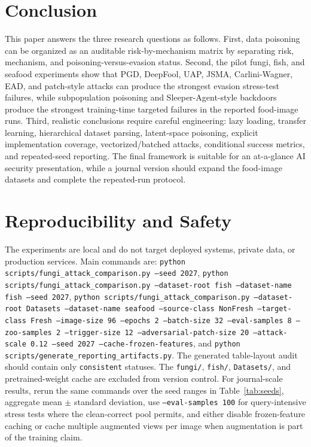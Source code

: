 ﻿\documentclass[6p,10pt,times]{ieeeaccess}
\begin{document}
\section{Conclusion}

This paper answers the three research questions as follows. First, data poisoning can be organized as an auditable risk-by-mechanism matrix by separating risk, mechanism, and poisoning-versus-evasion status. Second, the pilot fungi, fish, and seafood experiments show that PGD, DeepFool, UAP, JSMA, Carlini-Wagner, EAD, and patch-style attacks can produce the strongest evasion stress-test failures, while subpopulation poisoning and Sleeper-Agent-style backdoors produce the strongest training-time targeted failures in the reported food-image runs. Third, realistic conclusions require careful engineering: lazy loading, transfer learning, hierarchical dataset parsing, latent-space poisoning, explicit implementation coverage, vectorized/batched attacks, conditional success metrics, and repeated-seed reporting. The final framework is suitable for an at-a-glance AI security presentation, while a journal version should expand the food-image datasets and complete the repeated-run protocol.

\section*{Reproducibility and Safety}

The experiments are local and do not target deployed systems, private data, or production services. Main commands are:
\texttt{python scripts/fungi\_attack\_comparison.py --seed 2027},
\texttt{python scripts/fungi\_attack\_comparison.py --dataset-root fish --dataset-name fish --seed 2027},
\texttt{python scripts/fungi\_attack\_comparison.py --dataset-root Datasets --dataset-name seafood --source-class NonFresh --target-class Fresh --image-size 96 --epochs 2 --batch-size 32 --eval-samples 8 --zoo-samples 2 --trigger-size 12 --adversarial-patch-size 20 --attack-scale 0.12 --seed 2027 --cache-frozen-features}, and
\texttt{python scripts/generate\_reporting\_artifacts.py}.
The generated table-layout audit should contain only \texttt{consistent} statuses. The \texttt{fungi/}, \texttt{fish/}, \texttt{Datasets/}, and pretrained-weight cache are excluded from version control. For journal-scale results, rerun the same commands over the seed ranges in Table~\ref{tab:seeds}, aggregate mean \(\pm\) standard deviation, use \texttt{--eval-samples 100} for query-intensive stress tests where the clean-correct pool permits, and either disable frozen-feature caching or cache multiple augmented views per image when augmentation is part of the training claim.
\end{document}
